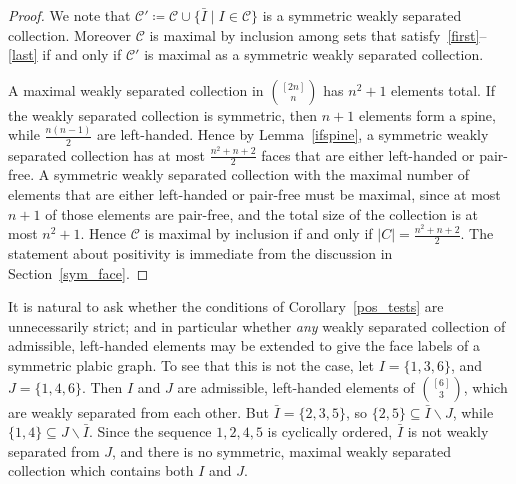 \documentclass[ALCO,ThmDefs,Unicode,epreuves]{cedram}
\begin{document}
\begin{proof}

We note that $\mathcal{C}' \coloneqq \mathcal{C} \cup \{\bar{I} \mid I \in \mathcal{C}\}$
is a symmetric weakly separated collection. Moreover $\mathcal{C}$ is maximal by inclusion among sets that satisfy~\eqref{first}--\eqref{last} if and only if $\mathcal{C}'$ is maximal as a symmetric weakly separated collection.

A maximal weakly separated collection in $\binom{[2n]}{n}$ has $n^2 + 1$ elements total. If the weakly separated collection is symmetric, then $n+1$ elements form a spine, while $\frac{n(n-1)}{2}$ are left-handed. Hence by Lemma~\ref{ifspine}, a symmetric weakly separated collection has at most 
$\frac{n^2 + n + 2}{2}$ faces that are either left-handed or pair-free. A symmetric weakly separated collection with the maximal number of elements that are either left-handed or pair-free must be maximal, since at most $n+1$ of those elements are pair-free, and the total size of the collection is at most $n^2 + 1$. Hence $\mathcal{C}$ is maximal by inclusion if and only if $|C| = \frac{n^2 + n + 2}{2}$.
The statement about positivity is immediate from the discussion in Section~\ref{sym_face}.\end{proof}

\begin{rema}It is natural to ask whether the conditions of Corollary~\ref{pos_tests} are unnecessarily strict; and in particular whether \emph{any} weakly separated collection of admissible, left-handed elements may be extended to give the face labels of a symmetric plabic graph.
To see that this is not the case, let $I = \{1,3,6\}$, and $J = \{1,4,6\}$. Then $I$ and $J$ are admissible, left-handed elements of $\binom{[6]}{3}$, which are weakly separated from each other.
But $\bar{I} = \{2,3,5\}$, so $\{2, 5\} \subseteq \bar{I}\backslash J$, while $\{1,4\} \subseteq J \backslash \bar{I}$. Since the sequence $1,2, 4, 5$ is cyclically ordered, $\bar{I}$ is not weakly separated from $J$, and there is no symmetric, maximal weakly separated collection which contains both $I$ and $J$.
\end{rema}

\nocite{*}


\end{document}
